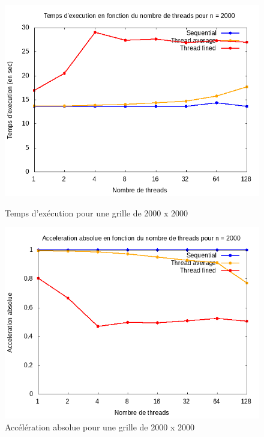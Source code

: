 \documentclass[10pt,a4paper]{article}
\begin{document}
\begin{figure}[!tbp]
  \centering
  \begin{minipage}[b]{0.49\textwidth}
	\includegraphics[width=\textwidth]{./Time/size_2000_time.png}
    \caption{Temps d'exécution pour une grille de 2000 x 2000}
  \end{minipage}
  \hfill
  \begin{minipage}[b]{0.49\textwidth}
    \includegraphics[width=\textwidth]{./Time/size_2000_acceleration.png}
    \caption{Accélération absolue pour une grille de 2000 x 2000}
  \end{minipage}
\end{figure}
\end{document}
